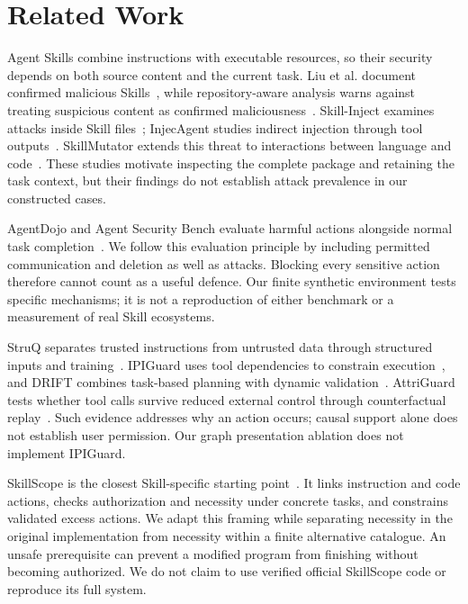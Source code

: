 \section{Related Work}
Agent Skills combine instructions with executable resources, so their security
depends on both source content and the current task. Liu et al. document
confirmed malicious Skills~\cite{liu}, while repository-aware analysis warns
against treating suspicious content as confirmed maliciousness~\cite{context}.
Skill-Inject examines attacks inside Skill files~\cite{skillinject};
InjecAgent studies indirect injection through tool outputs~\cite{injecagent}.
SkillMutator extends this threat to interactions between language and
code~\cite{skillmutator}. These studies motivate inspecting the complete package
and retaining the task context, but their findings do not establish attack
prevalence in our constructed cases.

AgentDojo and Agent Security Bench evaluate harmful actions alongside normal
task completion~\cite{agentdojo,asb}. We follow this evaluation principle by
including permitted communication and deletion as well as attacks. Blocking
every sensitive action therefore cannot count as a useful defence. Our finite
synthetic environment tests specific mechanisms; it is not a reproduction of
either benchmark or a measurement of real Skill ecosystems.

StruQ separates trusted instructions from untrusted data through structured
inputs and training~\cite{struq}. IPIGuard uses tool dependencies to constrain
execution~\cite{ipiguard}, and DRIFT combines task-based planning with dynamic
validation~\cite{drift}. AttriGuard tests whether tool calls survive reduced
external control through counterfactual replay~\cite{attriguard}. Such evidence
addresses why an action occurs; causal support alone does not establish user
permission. Our graph presentation ablation does not implement IPIGuard.

SkillScope is the closest Skill-specific starting point~\cite{skillscope}. It
links instruction and code actions, checks authorization and necessity under
concrete tasks, and constrains validated excess actions. We adapt this framing
while separating necessity in the original implementation from necessity within
a finite alternative catalogue. An unsafe prerequisite can prevent a modified
program from finishing without becoming authorized. We do not claim to use
verified official SkillScope code or reproduce its full system.

